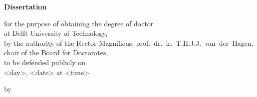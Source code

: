 \begin{titlepage}

\begin{center}

\vspace*{2\bigskipamount}

{\makeatletter
\titlestyle\bfseries\LARGE\@title
\makeatother}

{\makeatletter
\ifx\@subtitle\undefined\else
    \bigskip
    \titlefont\titleshape\Large\@subtitle
\fi
\makeatother}

\end{center}

\cleardoublepage
\thispagestyle{empty}

\begin{center}


\vspace*{2\bigskipamount}

{\makeatletter
\titlestyle\bfseries\LARGE\@title
\makeatother}

{\makeatletter
\ifx\@subtitle\undefined\else
    \bigskip
    \titlefont\titleshape\Large\@subtitle
\fi
\makeatother}

\vfill


{\Large\titlefont\bfseries Dissertation}

\bigskip
\bigskip

for the purpose of obtaining the degree of doctor \\
at Delft University of Technology, \\
by the authority of the Rector Magnificus, prof.~dr.~ir.~T.H.J.J.~van~der~Hagen, \\
chair of the Board for Doctorates, \\
to be defended publicly on \\
<day>, <date> at <time>

\bigskip
\bigskip

by

\bigskip
\bigskip

\makeatletter
{\Large\titlefont\bfseries\@firstname\ \titleshape{\MakeUppercase{\@lastname}}}
\makeatother


\end{center}
\end{titlepage}
